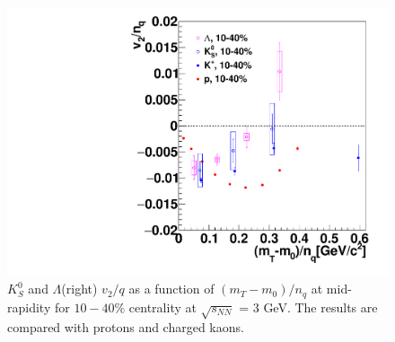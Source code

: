 \begin{figure}[h]
\includegraphics[width=0.80\linewidth]{chapterX/fig/data_v2_ld_ks_mt.pdf}
\caption{$K^0_S$ and $\Lambda$(right) $v_2/q$ as a function of $(m_{T}-m_{0})/n_{q}$ at mid-rapidity for $10-40\%$ centrality at $\sqrt{s_{NN}}$ = 3 GeV. The results are compared with protons and charged kaons.}
\label{ldks_dv2dmt}
\end{figure}
